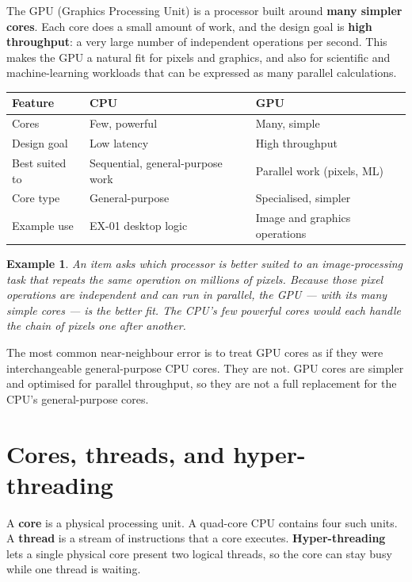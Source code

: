 \documentclass[11pt]{article}
\newtheorem{example}{Example}[section]
\begin{document}
The GPU (Graphics Processing Unit) is a processor built around
\textbf{many simpler cores}. Each core does a small amount of work, and the
design goal is \textbf{high throughput}: a very large number of independent
operations per second. This makes the GPU a natural fit for pixels and
graphics, and also for scientific and machine-learning workloads that can be
expressed as many parallel calculations.

\begin{center}
\begin{tabular}{p{}p{}p{}}
\toprule
\textbf{Feature} & \textbf{CPU} & \textbf{GPU}\\
\midrule
Cores & Few, powerful & Many, simple\\
Design goal & Low latency & High throughput\\
Best suited to & Sequential, general-purpose work & Parallel work (pixels, ML)\\
Core type & General-purpose & Specialised, simpler\\
Example use & EX-01 desktop logic & Image and graphics operations\\
\bottomrule
\end{tabular}
\end{center}

\begin{example}
An item asks which processor is better suited to an image-processing task
that repeats the same operation on millions of pixels. Because those pixel
operations are independent and can run in parallel, the GPU --- with its many
simple cores --- is the better fit. The CPU's few powerful cores would each
handle the chain of pixels one after another.
\end{example}

The most common near-neighbour error is to treat GPU cores as if they were
interchangeable general-purpose CPU cores. They are not. GPU cores are
simpler and optimised for parallel throughput, so they are not a full
replacement for the CPU's general-purpose cores.

\section{Cores, threads, and hyper-threading}
A \textbf{core} is a physical processing unit. A quad-core CPU contains four
such units. A \textbf{thread} is a stream of instructions that a core
executes. \textbf{Hyper-threading} lets a single physical core present two
logical threads, so the core can stay busy while one thread is waiting.
\end{document}

